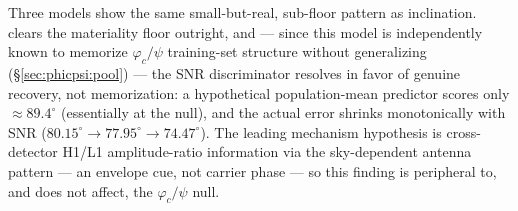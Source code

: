 \begin{table}[tbp]
    \centering
    \caption{Sky-position angular separation.}
    \label{tab:sky}
\end{table}

Three models show the same small-but-real, sub-floor pattern as inclination.
\cnnAttn clears the materiality floor outright, and --- since this model is independently known to memorize $\varphi_c/\psi$ training-set structure without generalizing (\S\ref{sec:phicpsi:pool}) --- the SNR discriminator resolves in favor of genuine recovery, not memorization: a hypothetical population-mean predictor scores only $\approx89.4^\circ$ (essentially at the null), and the actual error shrinks monotonically with SNR ($80.15^\circ\to77.95^\circ\to74.47^\circ$).
The leading mechanism hypothesis is cross-detector H1/L1 amplitude-ratio information via the sky-dependent antenna pattern --- an envelope cue, not carrier phase --- so this finding is peripheral to, and does not affect, the $\varphi_c/\psi$ null.
